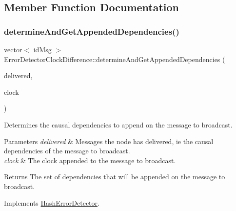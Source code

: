 \subsection{Member Function Documentation}
\mbox{\label{class_error_detector_clock_difference_a15406c8d7652f3b9358b1958d3723933}} 
\subsubsection{\texorpdfstring{determine\+And\+Get\+Appended\+Dependencies()}{determineAndGetAppendedDependencies()}}
{\footnotesize\ttfamily vector$<$ \hyperlink{structures_8h_a83a1d9a070efa5341da84cfd8e28d3e5}{id\+Msg} $>$ Error\+Detector\+Clock\+Difference\+::determine\+And\+Get\+Appended\+Dependencies (\begin{DoxyParamCaption}\item[{const vector$<$ \hyperlink{structures_8h_a7e7bdc1d2fff8a9436f2f352b2711ed6}{message\+Info} $>$ \&}]{delivered,  }\item[{const \hyperlink{class_probabilistic_clock}{Probabilistic\+Clock} \&}]{clock }\end{DoxyParamCaption})\hspace{0.3cm}{\ttfamily [virtual]}}



Determines the causal dependencies to append on the message to broadcast. 


\begin{DoxyParams}{Parameters}
{\em delivered} & Messages the node has delivered, ie the causal dependencies of the message to broadcast. \\
\hline
{\em clock} & The clock appended to the message to broadcast. \\
\hline
\end{DoxyParams}
\begin{DoxyReturn}{Returns}
The set of dependencies that will be appended on the message to broadcast. 
\end{DoxyReturn}


Implements \hyperlink{class_hash_error_detector_ae45353331e29b50a0aa2fc6dd540ed4e}{Hash\+Error\+Detector}.

